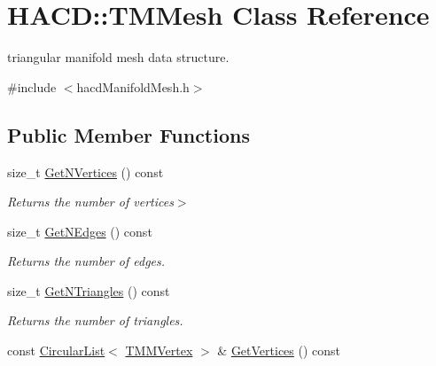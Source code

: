 \hypertarget{class_h_a_c_d_1_1_t_m_mesh}{\section{H\+A\+C\+D\+:\+:T\+M\+Mesh Class Reference}
\label{class_h_a_c_d_1_1_t_m_mesh}
}


triangular manifold mesh data structure.  




{\ttfamily \#include $<$hacd\+Manifold\+Mesh.\+h$>$}

\subsection*{Public Member Functions}
\begin{DoxyCompactItemize}
\item 
\hypertarget{class_h_a_c_d_1_1_t_m_mesh_a45fee50bdd466e85948601e686a9f2d0}{size\+\_\+t \hyperlink{class_h_a_c_d_1_1_t_m_mesh_a45fee50bdd466e85948601e686a9f2d0}{Get\+N\+Vertices} () const }\label{class_h_a_c_d_1_1_t_m_mesh_a45fee50bdd466e85948601e686a9f2d0}

\begin{DoxyCompactList}\small\item\em Returns the number of vertices$>$ \end{DoxyCompactList}\item 
\hypertarget{class_h_a_c_d_1_1_t_m_mesh_a7a5e9dc599b937bcee86e783010337f4}{size\+\_\+t \hyperlink{class_h_a_c_d_1_1_t_m_mesh_a7a5e9dc599b937bcee86e783010337f4}{Get\+N\+Edges} () const }\label{class_h_a_c_d_1_1_t_m_mesh_a7a5e9dc599b937bcee86e783010337f4}

\begin{DoxyCompactList}\small\item\em Returns the number of edges. \end{DoxyCompactList}\item 
\hypertarget{class_h_a_c_d_1_1_t_m_mesh_af162d336900be13f51fc1e0e865d8023}{size\+\_\+t \hyperlink{class_h_a_c_d_1_1_t_m_mesh_af162d336900be13f51fc1e0e865d8023}{Get\+N\+Triangles} () const }\label{class_h_a_c_d_1_1_t_m_mesh_af162d336900be13f51fc1e0e865d8023}

\begin{DoxyCompactList}\small\item\em Returns the number of triangles. \end{DoxyCompactList}\item 
\hypertarget{class_h_a_c_d_1_1_t_m_mesh_ab90aca36a7e41ce5196a053c9f0a9287}{const \hyperlink{class_h_a_c_d_1_1_circular_list}{Circular\+List}$<$ \hyperlink{class_h_a_c_d_1_1_t_m_m_vertex}{T\+M\+M\+Vertex} $>$ \& \hyperlink{class_h_a_c_d_1_1_t_m_mesh_ab90aca36a7e41ce5196a053c9f0a9287}{Get\+Vertices} () const }\label{class_h_a_c_d_1_1_t_m_mesh_ab90aca36a7e41ce5196a053c9f0a9287}


\end{DoxyCompactItemize}
